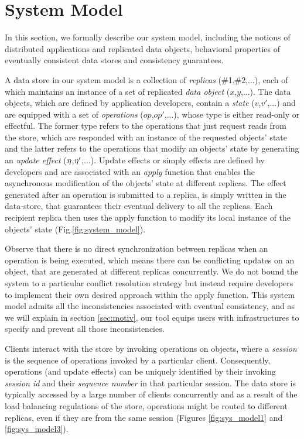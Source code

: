 \newpage
\section{System Model}
\label{sec:sys_model}
In this section, we formally describe our system model, including the
notions of distributed applications and replicated data objects,
behavioral properties of eventually consistent data stores and
consistency guarantees.


A data store in our system model is a collection of \emph{replicas}
(\#1,\#2,...),
each of which maintains an instance of a set of  replicated \emph{data
object} ($x$,$y$,...).
The data objects,
which are defined by application developers, contain a \emph{state}
($v$,$v'$,...) and
are equipped with a set of \emph{operations} ($op$,$op'$,...), whose
type is either
read-only or effectful. 
The former type refers to the operations that just request reads from the
store, which are responded with an instance of the requested objects' state and the
latter refers to the operations that modify an objects' state by generating
an \emph{update effect} ($\eta$,$\eta'$,...).  Update effects or simply effects
are defined by
developers and are associated with an \emph{apply} function that enables
the asynchronous modification of the objects' state at different replicas.
The effect generated after an operation is submitted to a replica, is
simply written in the data-store, that guarantees
their eventual delivery to all the replicas. Each recipient replica then
uses the apply function to modify its local instance of the objects'
state  (Fig.\ref{fig:system_model}).

Observe that there is no direct synchronization between replicas when an
operation is being executed, which means there can be conflicting
updates on an object, that are generated at different replicas
concurrently. 
We do not bound the system to a particular
conflict resolution strategy but instead require developers to implement
their own desired approach within the apply function. This system model
admits all the inconsistencies associated with eventual consistency, and
as we will explain in section \ref{sec:motiv}, our tool equips users
with infrastructures to specify and prevent all those inconsistencies.

Clients interact
with the store by invoking operations on objects, where a \emph{session} is
the sequence of operations invoked by a particular client. Consequently,
operations
(and update effects) can be uniquely identified by
their invoking \emph{session id} and their \emph{sequence number} in
that particular session. The data store is typically accessed by a large
number of clients concurrently and as a result of the load balancing
regulations of the store, operations might be routed to different replicas,
even if they are from the same session (Figures \ref{fig:sys_model1} and
\ref{fig:sys_model3}).

